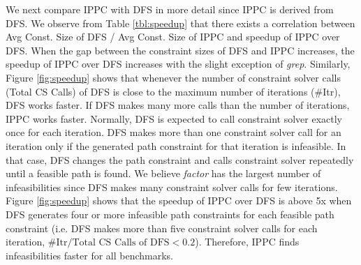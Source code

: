 \documentclass[EPiCempty]{easychair}
\begin{document}
We next compare IPPC with DFS in more detail since IPPC is derived from DFS.
%
We observe from Table \ref{tbl:speedup} that there exists a correlation between Avg Const. Size of DFS / Avg Const. Size of IPPC and speedup of IPPC over DFS. When the gap between the constraint sizes of DFS and IPPC increases, the speedup of IPPC over DFS increases with the slight exception of \emph{grep}.
Similarly, Figure \ref{fig:speedup} shows that whenever the number of constraint solver calls (Total CS Calls) of DFS is close to the maximum number of iterations ({\#}Itr), DFS works faster. If DFS makes many more calls than the number of iterations, IPPC works faster. Normally, DFS is expected to call constraint solver exactly once for each iteration. DFS makes more than one constraint solver call for an iteration only if the generated path constraint for that iteration is infeasible. In that case, DFS changes the path constraint and calls constraint solver repeatedly until a feasible path is found. We believe \emph{factor} has the largest number of infeasibilities since DFS makes many constraint solver calls for few iterations. Figure \ref{fig:speedup} shows that the speedup of IPPC over DFS is above 5x when DFS generates four or more infeasible path constraints for each feasible path constraint (i.e. DFS makes more than five constraint solver calls for each iteration, $\text{{\#}Itr} / \text{Total CS Calls of DFS} < 0.2$). Therefore, IPPC finds infeasibilities faster for all benchmarks.

\end{document}
